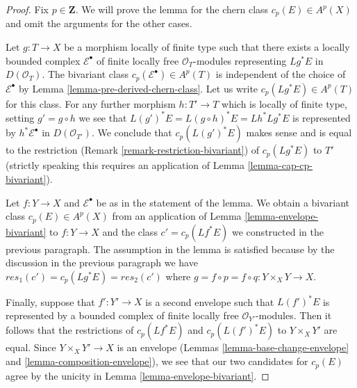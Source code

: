 \documentclass[10pt,a4paper]{amsart}
\theoremstyle{plain}
\theoremstyle{definition}
\theoremstyle{remark}
\numberwithin{equation}{subsection}
\begin{document}
\begin{proof}
Fix $p \in \mathbf{Z}$. We will prove the lemma for the chern
class $c_p(E) \in A^p(X)$ and omit the arguments for the other cases.

\medskip\noindent
Let $g : T \to X$ be a morphism locally of finite type such that
there exists a locally bounded complex $\mathcal{E}^\bullet$ of finite locally
free $\mathcal{O}_T$-modules representing $Lg^*E$ in $D(\mathcal{O}_T)$.
The bivariant class $c_p(\mathcal{E}^\bullet) \in A^p(T)$
is independent of the choice of $\mathcal{E}^\bullet$ by
Lemma \ref{lemma-pre-derived-chern-class}.
Let us write $c_p(Lg^*E) \in A^p(T)$ for this class.
For any further morphism $h : T' \to T$ which is locally
of finite type, setting $g' = g \circ h$ we see that
$L(g')^*E = L(g \circ h)^*E = Lh^*Lg^*E$ is represented by
$h^*\mathcal{E}^\bullet$ in $D(\mathcal{O}_{T'})$.
We conclude that $c_p(L(g')^*E)$ makes sense and is equal to the
restriction (Remark \ref{remark-restriction-bivariant})
of $c_p(Lg^*E)$ to $T'$ (strictly speaking this requires an application of
Lemma \ref{lemma-cap-cp-bivariant}).

\medskip\noindent
Let $f : Y \to X$ and $\mathcal{E}^\bullet$ be as in the statement
of the lemma. We obtain a bivariant class $c_p(E) \in A^p(X)$ from
an application of Lemma \ref{lemma-envelope-bivariant}
to $f : Y \to X$ and the class $c' = c_p(Lf^*E)$ we constructed
in the previous paragraph. The assumption in the lemma is
satisfied because by the discussion in the previous paragraph we have
$res_1(c') = c_p(Lg^*E) = res_2(c')$ where
$g = f \circ p = f \circ q : Y \times_X Y \to X$.

\medskip\noindent
Finally, suppose that $f' : Y' \to X$ is a second envelope
such that $L(f')^*E$ is represented by a bounded complex of
finite locally free $\mathcal{O}_{Y'}$-modules. Then it follows
that the restrictions of $c_p(Lf^*E)$ and $c_p(L(f')^*E)$
to $Y \times_X Y'$ are equal. Since $Y \times_X Y' \to X$
is an envelope (Lemmas \ref{lemma-base-change-envelope} and
\ref{lemma-composition-envelope}), we see that our two candidates for $c_p(E)$
agree by the unicity in Lemma \ref{lemma-envelope-bivariant}.
\end{proof}
\end{document}
